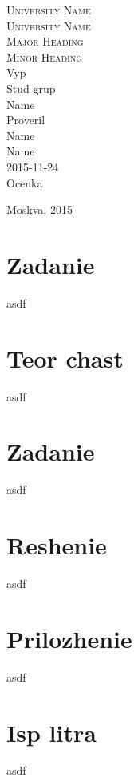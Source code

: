 \documentclass[13pt]{article}
\begin{document}
  
\begin{titlepage}

\center

\fontsize{50pt}{80pt}\selectfont
\textsc{\LARGE University Name}\\[1.5cm]
\textsc{\LARGE University Name}\\[2.0cm]
\textsc{\Large Major Heading}\\[0.5cm]
\textsc{\large Minor Heading}\\[0.5cm]

{\centering \large 
\hfill Vyp \\
\hfill Stud grup \\
\hfill Name \\
\hfill Proveril \\
\hfill Name \\
\hfill Name \\
\hfill 2015-11-24 \\
\hfill Ocenka \\
}

{\large Moskva, 2015}\\[3cm]

\end{titlepage}
  
\newpage
\tableofcontents
{}
\newpage

\section{Zadanie}
asdf
\newpage

\section{Teor chast}
asdf
\newpage

\section{Zadanie}
asdf
\newpage

\section{Reshenie}
asdf
\newpage

\section{Prilozhenie}
asdf
\newpage

\section{Isp litra}
asdf
\newpage
\end{document}
